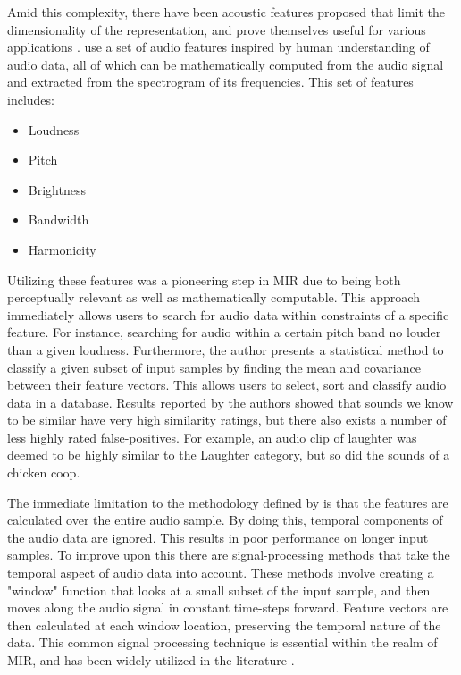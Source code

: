 \documentclass[12pt]{article}
\begin{document}
Amid this complexity, there have been acoustic features proposed that limit the dimensionality of the representation, and prove themselves useful for various applications \citep{Wold96,Typke04,Prechelt01}. \cite{Wold96} use a set of audio features inspired by human understanding of audio data, all of which can be mathematically computed from the audio signal and extracted from the spectrogram of its frequencies. This set of features includes: 
\begin{itemize}
\item Loudness
\item Pitch
\item Brightness
\item Bandwidth
\item Harmonicity
\end{itemize}
Utilizing these features was a pioneering step in MIR due to being both perceptually relevant as well as mathematically computable. This approach immediately allows users to search for audio data within constraints of a specific feature. For instance, searching for audio within a certain pitch band no louder than a given loudness. Furthermore, the author presents a statistical method to classify a given subset of input samples by finding the mean and covariance between their feature vectors. This allows users to select, sort and classify audio data in a database. Results reported by the authors showed that sounds we know to be similar have very high similarity ratings, but there also exists a number of less highly rated false-positives. For example, an audio clip of laughter was deemed to be highly similar to the Laughter category, but so did the sounds of a chicken coop.

The immediate limitation to the methodology defined by \citet{Wold96} is that the features are calculated over the entire audio sample. By doing this, temporal components of the audio data are ignored. This results in poor performance on longer input samples. To improve upon this there are signal-processing methods that take the temporal aspect of audio data into account. These methods involve creating a "window" function that looks at a small subset of the input sample, and then moves along the audio signal in constant time-steps forward. Feature vectors are then calculated at each window location, preserving the temporal nature of the data. This common signal processing technique is essential within the realm of MIR, and has been widely utilized in the literature \citet{Foote1997,Lidy05,Tzanetakis02,Hamel2010LearningFeatures,mierswa2005automatic}.
\end{document}
